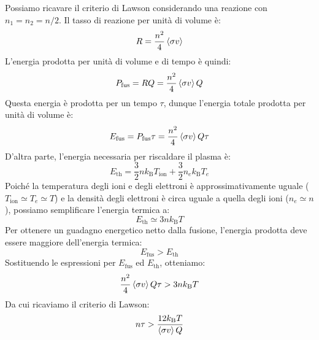 Possiamo ricavare il criterio di Lawson considerando una reazione con $n_1 = n_2 = n/2$. Il tasso di reazione per unità di volume è:
\begin{equation}
    R = \dfrac{n^2}{4} \left\langle \sigma v \right\rangle
\end{equation}
L'energia prodotta per unità di volume e di tempo è quindi:
\begin{equation}
    P_{\text{fus}} = R Q = \dfrac{n^2}{4} \left\langle \sigma v \right\rangle Q
\end{equation}
Questa energia è prodotta per un tempo $\tau$, dunque l'energia totale prodotta per unità di volume è:
\begin{equation}
    E_{\text{fus}} = P_{\text{fus}} \tau = \dfrac{n^2}{4} \left\langle \sigma v \right\rangle Q \tau
\end{equation}
D'altra parte, l'energia necessaria per riscaldare il plasma è:
\begin{equation}
    E_{\text{th}} = \dfrac{3}{2} n k_{\text{B}} T_{\text{ion}} + \dfrac{3}{2} n_e k_{\text{B}} T_{e}
\end{equation}
Poiché la temperatura degli ioni e degli elettroni è approssimativamente uguale ($T_{\text{ion}} \simeq T_e \simeq T$) e la densità degli elettroni è circa uguale a quella degli ioni ($n_e \simeq n$), possiamo semplificare l'energia termica a:
\begin{equation}
    E_{\text{th}} \simeq 3 n k_{\text{B}} T
\end{equation}
Per ottenere un guadagno energetico netto dalla fusione, l'energia prodotta deve essere maggiore dell'energia termica:
\begin{equation}
    E_{\text{fus}} > E_{\text{th}}
\end{equation}
Sostituendo le espressioni per $E_{\text{fus}}$ ed $E_{\text{th}}$, otteniamo:
\begin{equation}
    \dfrac{n^2}{4} \left\langle \sigma v \right\rangle Q \tau > 3 n k_{\text{B}} T
\end{equation}
Da cui ricaviamo il criterio di Lawson:
\begin{equation}
    n \tau > \dfrac{12 k_{\text{B}} T}{\left\langle \sigma v \right\rangle Q}
\end{equation}
